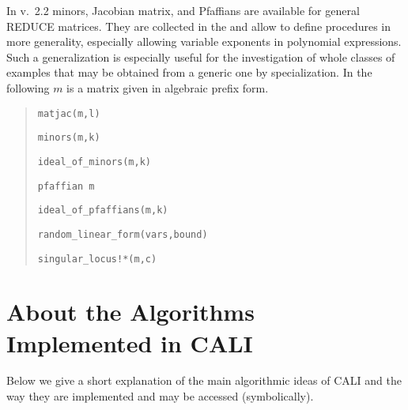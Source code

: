 In v.\ 2.2 minors, Jacobian matrix, and Pfaffians are available for
general REDUCE matrices. They are collected in the  and allow to define procedures in more generality, especially
allowing variable exponents in polynomial expressions. Such a
generalization is especially useful for the investigation of whole
classes of examples that may be obtained from a generic one by
specialization. In the following $m$ is a matrix given in algebraic
prefix form. 
\begin{quote}
\verb|matjac(m,l)| 


\verb|minors(m,k)| 


\verb|ideal_of_minors(m,k)| 


\verb|pfaffian m| 


\verb|ideal_of_pfaffians(m,k)| 


\verb|random_linear_form(vars,bound)| 


\verb|singular_locus!*(m,c)| 

\end{quote}

\section{About the Algorithms Implemented in CALI}

Below we give a short explanation of the main algorithmic ideas of
CALI and the way they are implemented and may be accessed
(symbolically). 


